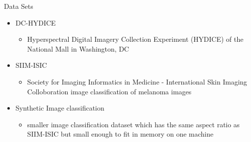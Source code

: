 \documentclass{beamer}
\begin{document}
\begin{frame}{Data Sets}
    \begin{itemize}
        \item DC-HYDICE
        \begin{itemize}
            \item Hyperspectral Digital Imagery Collection Experiment (HYDICE) of the National Mall in Washington, DC
        \end{itemize}
        \item SIIM-ISIC
        \begin{itemize}
            \item Society for Imaging Informatics in Medicine - International Skin Imaging Colloboration image classification of melanoma images
        \end{itemize}
        \item Synthetic Image classification
        \begin{itemize}
            \item smaller image classification dataset which has the same aspect ratio as SIIM-ISIC but small enough to fit in memory on one machine
        \end{itemize}
    \end{itemize}
\end{frame}
\end{document}
